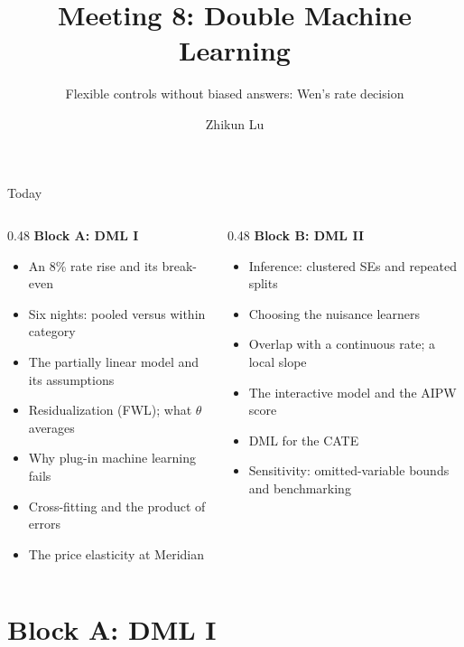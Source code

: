 \documentclass[aspectratio=169, 11pt, handout]{beamer}
\title[Meeting 8]{Meeting 8: Double Machine Learning}
\subtitle{Flexible controls without biased answers: Wen's rate decision}
\author{Zhikun Lu}
\date{}
\begin{document}
\begin{frame}
\titlepage
\end{frame}

\begin{frame}{Today}

\begin{columns}[T]
\begin{column}{0.48\textwidth}
\textbf{Block A: DML I}
\begin{itemize}
  \item An 8\% rate rise and its break-even
  \item Six nights: pooled versus within category
  \item The partially linear model and its assumptions
  \item Residualization (FWL); what $\theta$ averages
  \item Why plug-in machine learning fails
  \item Cross-fitting and the product of errors
  \item The price elasticity at Meridian
\end{itemize}
\end{column}
\begin{column}{0.48\textwidth}
\textbf{Block B: DML II}
\begin{itemize}
  \item Inference: clustered SEs and repeated splits
  \item Choosing the nuisance learners
  \item Overlap with a continuous rate; a local slope
  \item The interactive model and the AIPW score
  \item DML for the CATE
  \item Sensitivity: omitted-variable bounds and benchmarking
\end{itemize}
\end{column}
\end{columns}
\end{frame}

\section{Block A: DML I}
\end{document}
